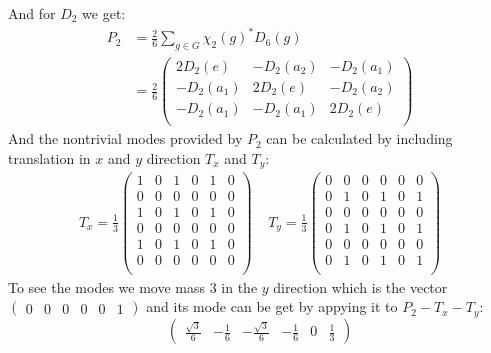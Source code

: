 \documentclass[a4paper]{article}
\theoremstyle{definition}
\theoremstyle{definition}
\theoremstyle{definition}
\theoremstyle{theorem}
\theoremstyle{theorem}
\theoremstyle{definition}
\begin{document}
And for $D_2$ we get:
\begin{align}
    P_2 &= \frac{2}{6} \sum _{g\in G} \chi _{2}(g)^* D_6(g) \nonumber \\
        &=\frac{2}{6}
        \begin{pmatrix}
            2D_2(e) & -D_2(a_2) & -D_2(a_1) \\
            -D_2(a_1) & 2D_2(e) & -D_2(a_2)\\
            -D_2(a_1) & -D_2(a_1) & 2D_2(e) \\
        \end{pmatrix} \nonumber
\end{align}
And the nontrivial modes provided by $P_2$ can be calculated by including translation in $x$ and $y$
direction $T_x$ and $T_y$:
\begin{align*}
    T_x = \frac{1}{3}
\begin{pmatrix}
    1 & 0 & 1 & 0 & 1 & 0 \\
    0 & 0 & 0 & 0 & 0 & 0 \\
    1 & 0 & 1 & 0 & 1 & 0 \\
    0 & 0 & 0 & 0 & 0 & 0 \\
    1 & 0 & 1 & 0 & 1 & 0 \\
    0 & 0 & 0 & 0 & 0 & 0 \\
\end{pmatrix}
    \;\;\;\;
    T_y = \frac{1}{3}
\begin{pmatrix}
    0 & 0 & 0 & 0 & 0 & 0 \\
    0 & 1 & 0 & 1 & 0 & 1 \\
    0 & 0 & 0 & 0 & 0 & 0 \\
    0 & 1 & 0 & 1 & 0 & 1 \\
    0 & 0 & 0 & 0 & 0 & 0 \\
    0 & 1 & 0 & 1 & 0 & 1 \\
\end{pmatrix}
\end{align*}
To see the modes we move mass $3$ in the $y$ direction which is the vector $\begin{pmatrix}0&0&0&0&0&1\end{pmatrix}$ and its mode can be get by appying it to $P_2 -T_x -T_y$:
\begin{equation}
    \begin{pmatrix}
        \frac{\sqrt{3}}{6}&-\frac{1}{6}& -\frac{\sqrt{3}}{6} & -\frac{1}{6} & 0 & \frac{1}{3}
    \end{pmatrix}
    \label{eig: 3}
\end{equation}
\end{document}
